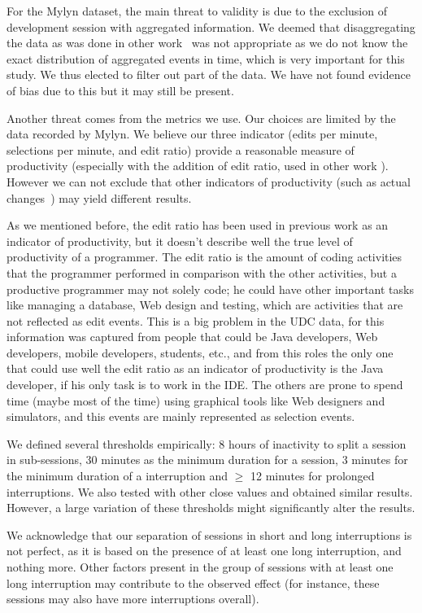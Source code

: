\documentclass[times]{smrauth}
\newcommand\RR[1]{\textbf{Romain #1}}
\begin{document}
For the Mylyn dataset, the main threat to validity is due to the exclusion of development session with aggregated information. We deemed that disaggregating the data as was done in other work~\cite{YR11}  was not appropriate as we do not know the exact distribution of aggregated events in time, which is very important for this study. We thus elected to filter out part of the data. We have not found evidence of bias due to this but it may still be present.

Another threat comes from the metrics we use. Our choices are limited by the data recorded by Mylyn. We believe our three indicator (edits per minute, selections per minute, and edit ratio) provide a reasonable measure of productivity (especially with the addition of edit ratio, used in other work \cite{KM06}). However we can not exclude that other indicators of productivity (such as actual changes~\cite{RL10}) may yield different results.

As we mentioned before, the edit ratio has been used in previous work as an indicator of productivity, but it doesn't describe well the true level of productivity of a programmer. The edit ratio is the amount of coding activities that the programmer performed in comparison with the other activities, but a productive programmer may not solely code; he could have other important tasks like managing a database, Web design and testing, which are activities that are not reflected as edit events. This is a big problem in the UDC data, for this information was captured from people that could be Java developers, Web developers, mobile developers, students, etc., and from this roles the only one that could use well the edit ratio as an indicator of productivity is the Java developer, if his only task is to work in the IDE. The others are prone to spend time (maybe most of the time) using graphical tools like Web designers and simulators, and this events are mainly represented as selection events.

We defined several thresholds empirically: 8 hours of inactivity to split a session in sub-sessions, 30 minutes as the minimum duration for a session, 3 minutes for the minimum duration of a interruption and  $\geq$ 12 minutes for prolonged interruptions. We also tested with other close values and obtained similar results. However, a large variation of these thresholds might significantly alter the results. 

We acknowledge that our separation of sessions in short and long interruptions is not perfect, as it is based on the presence of at least one long interruption, and nothing more. Other factors present in the group of sessions with at least one long interruption may contribute to the observed effect (for instance, these sessions may also have more interruptions overall).
\end{document}
